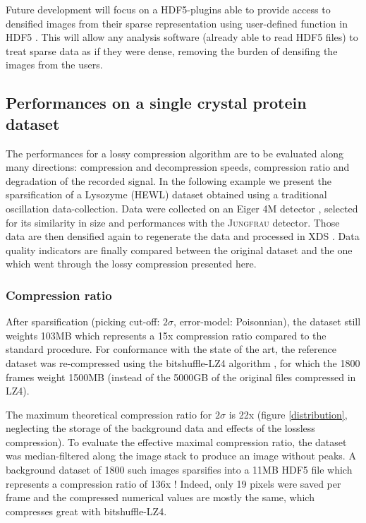 \documentclass[preprint]{iucr}              %
\begin{document}
Future development will focus on a HDF5-plugins able to provide access to densified images from their sparse representation using user-defined function in HDF5 \cite{hdf5-udf}.
This will allow any analysis software (already able to read HDF5 files) to treat sparse data as if they were dense, removing the burden of densifing the images from the users.

\subsection{Performances on a single crystal protein dataset}
The performances for a lossy compression algorithm are to be evaluated along many directions: compression and decompression speeds, compression ratio and degradation of the recorded signal.
In the following example we present the sparsification of a Lysozyme (HEWL) dataset obtained using a traditional oscillation data-collection. 
Data were collected on an Eiger 4M detector \cite{lysozyme}, selected for its similarity in size and performances with the \textsc{Jungfrau} detector.
Those data are then densified again to regenerate the data and processed in XDS \cite{xds}.
Data quality indicators are finally compared between the original dataset and the one which went through the lossy compression presented here.


\subsubsection{Compression ratio} 
After sparsification (picking cut-off: $2\sigma$, error-model: Poisonnian), the dataset still weights 103MB which represents a 15x compression ratio compared to the standard procedure.
For conformance with the state of the art, the reference dataset was re-compressed using the bitshuffle-LZ4 algorithm \cite{bitshuffle}, for which the 1800 frames weight 1500MB (instead of the 5000GB of the original files compressed in LZ4).

The maximum theoretical compression ratio for $2\sigma$ is 22x (figure \ref{distribution}, neglecting the storage of the background data and effects of the lossless compression).
To evaluate the effective maximal compression ratio, the dataset was median-filtered along the image stack to produce an image without peaks. 
A background dataset of 1800 such images sparsifies into a 11MB HDF5 file which represents a compression ratio of 136x ! 
Indeed, only 19 pixels were saved per frame and the compressed numerical values are mostly the same, which compresses great with bitshuffle-LZ4.
\end{document}
